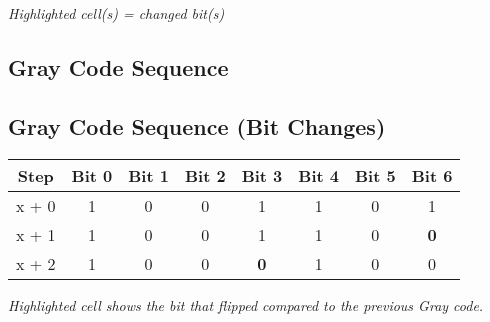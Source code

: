 \emph{Highlighted cell(s) = changed bit(s)}


\bigskip

\subsection*{Gray Code Sequence}
\subsection*{Gray Code Sequence (Bit Changes)}

\begin{tabular}{|c|*7{c|}}
\hline
Step &  Bit 0 &  Bit 1 &  Bit 2 &  Bit 3 &  Bit 4 &  Bit 5 &  Bit 6   \\
\hline
x + 0 &
    1
&    0
&    0
&    1
&    1
&    0
&    1
 \\
\hline
x + 1 &
    1
&    0
&    0
&    1
&    1
&    0
&    \cellcolor{yellow}\textbf{ 0 }
 \\
\hline
x + 2 &
    1
&    0
&    0
&    \cellcolor{yellow}\textbf{ 0 }
&    1
&    0
&    0
 \\
\hline
\end{tabular}

\emph{Highlighted cell shows the bit that flipped compared to the previous Gray code.}



\pagebreak